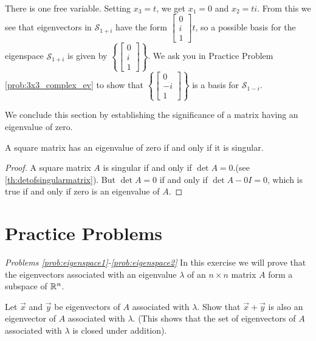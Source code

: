 \documentclass{ximera}
\begin{document}
\begin{example}
\begin{explanation}
\begin{align*}
\end{align*}
There is one free variable.  Setting $x_3=t$, we get $x_1=0$ and $x_2=ti$.  From this we see that eigenvectors in $\mathcal{S}_{1+i}$ have the form $\begin{bmatrix}0\\i\\1\end{bmatrix}t$, so a possible basis for the eigenspace $\mathcal{S}_{1+i}$ is given by $\left\{\begin{bmatrix}0\\i\\1\end{bmatrix}\right\}$.
We ask you in Practice Problem \ref{prob:3x3_complex_ev} to show that $\left\{\begin{bmatrix}0\\-i\\1\end{bmatrix}\right\}$ is a basis for $\mathcal{S}_{1-i}$.
\end{explanation}
\end{example}
    
We conclude this section by establishing the significance of a matrix having an eigenvalue of zero.
    
\begin{theorem}\label{th:zero_ew}
A square matrix has an eigenvalue of zero if and only if it is singular.
\end{theorem}
    
\begin{proof}
A square matrix $A$ is singular if and only if $\det{A}=0$.(see  \ref{th:detofsingularmatrix}).  But $\det{A}=0$ if and only if $\det{A-0I}=0$, which is true if and only if zero is an eigenvalue of $A$.
\end{proof}
    
\section*{Practice Problems}
    
\emph{Problems \ref{prob:eigenspace1}-\ref{prob:eigenspace2}}
In this exercise we will prove that the eigenvectors associated with an eigenvalue $\lambda$ of an $n \times n$ matrix $A$ form a subspace of $\mathbb{R}^n$.
    
\begin{problem}\label{prob:eigenspace1}
Let $\vec{x}$ and $\vec{y}$ be eigenvectors of $A$ associated with $\lambda$.  Show that $\vec{x}+\vec{y}$ is also an eigenvector of $A$ associated with $\lambda$.  (This shows that the set of eigenvectors of $A$ associated with $\lambda$ is closed under addition).
\end{problem}
    
\end{document}
